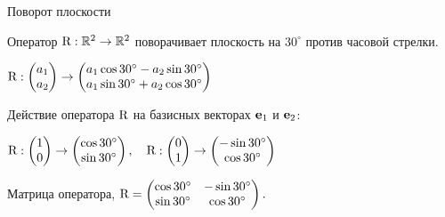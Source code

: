 \begin{frame}{Поворот плоскости}


Оператор $\mathrm{R} :\mathbb{R}^2 \to \mathbb{R}^2$ поворачивает плоскость на $30^{\circ}$ против часовой стрелки.

$\mathrm{R} : \begin{pmatrix}
  a_1 \\
  a_2 \\
\end{pmatrix} \to 
\begin{pmatrix}
  a_1\cos 30^{\circ} - a_2 \sin 30^{\circ}  \\
  a_1\sin 30^{\circ} + a_2 \cos 30^{\circ}  \\
\end{pmatrix}$

\pause

Действие оператора $\mathrm{R}$ на базисных векторах $\mathbf{e}_1$ и $\mathbf{e}_2$:

$\mathrm{R} : \begin{pmatrix}
  1 \\
  0 \\
\end{pmatrix} \to 
\begin{pmatrix}
\cos 30^{\circ}  \\
\sin 30^{\circ}  \\
\end{pmatrix}, \quad
\mathrm{R} : \begin{pmatrix}
  0 \\
  1 \\
\end{pmatrix} \to 
\begin{pmatrix}
 -\sin 30^{\circ}  \\
 \cos 30^{\circ} \\
\end{pmatrix}$

\pause

Матрица оператора, $\mathrm{R} = 
\begin{pmatrix}
  \cos 30^{\circ} & -\sin 30^{\circ}  \\
  \sin 30^{\circ} & \cos 30^{\circ} \\
\end{pmatrix}.$



\end{frame}
    


